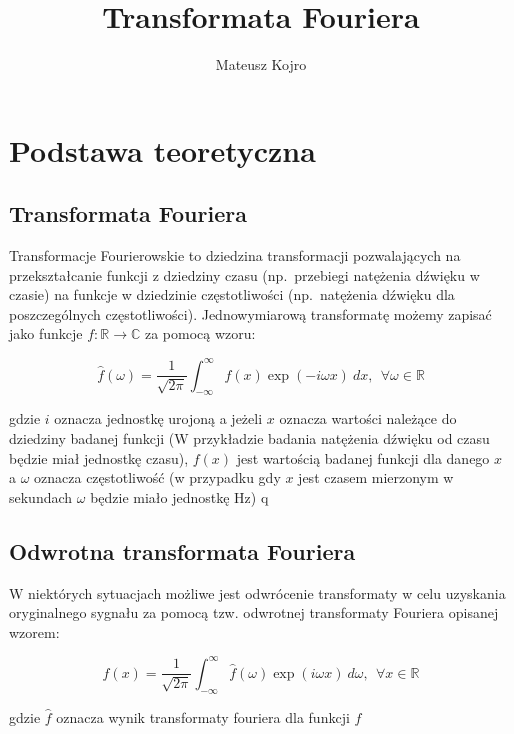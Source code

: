 \documentclass{artikel3}
\title{Transformata Fouriera}
\author{Mateusz Kojro}
\date{}
\begin{document}
\maketitle

\section{Podstawa teoretyczna}

\subsection{Transformata Fouriera}
Transformacje Fourierowskie to dziedzina transformacji pozwalających na przekształcanie
funkcji z dziedziny czasu (np.\ przebiegi natężenia dźwięku w czasie) na funkcje w dziedzinie częstotliwości (np.\ natężenia dźwięku dla poszczególnych częstotliwości). Jednowymiarową transformatę możemy zapisać jako funkcje $ f: \mathbb{R} \to \mathbb{C} $ za pomocą wzoru\cite{math_phys}:

\begin{equation}
    \hat{f}(\omega) = \frac{1}{\sqrt{2 \pi}} \int_{-\infty}^{\infty} f(x) \exp{(- i \omega x)} \ dx, \ \ \forall \omega \in \mathbb{R}
\end{equation}

gdzie $i$ oznacza jednostkę urojoną a jeżeli $x$ oznacza wartości należące do dziedziny badanej funkcji (W przykładzie badania natężenia dźwięku od czasu będzie miał jednostkę czasu), $f(x)$ jest wartością badanej funkcji dla danego $x$ a $\omega$ oznacza częstotliwość (w przypadku gdy $x$ jest czasem mierzonym w sekundach $\omega$ będzie miało jednostkę Hz)
q

\subsection{Odwrotna transformata Fouriera}

W niektórych sytuacjach możliwe jest odwrócenie transformaty w celu uzyskania oryginalnego sygnału za pomocą tzw. odwrotnej transformaty Fouriera opisanej wzorem\cite{math_phys}:

\begin{equation}
f(x) = \frac{1}{\sqrt{2 \pi}} \int_{-\infty}^{\infty} \hat{f}(\omega) \exp{( i \omega x)} \ d\omega, \ \ \forall x \in \mathbb{R}
\end{equation}

gdzie $\hat{f}$ oznacza wynik transformaty fouriera dla funkcji $f$
\end{document}
